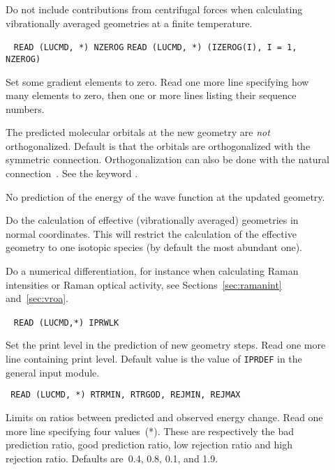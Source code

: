 \begin{description}
\item[] Do not include contributions from
centrifugal forces when calculating vibrationally averaged geometries
at a finite temperature.

\item[]\verb| |\newline
\verb|READ (LUCMD, *) NZEROG|\newline
\verb|READ (LUCMD, *) (IZEROG(I), I = 1, NZEROG)|

 Set some gradient elements  to zero.  Read
one more line specifying how many elements to zero, then one
or more lines listing their sequence numbers.

\item[] The predicted molecular orbitals at the new
geometry are {\em not} orthogonalized. Default is that the orbitals
are orthogonalized with the symmetric connection. Orthogonalization
can also be done with the natural
connection~\cite{joklbkrthpjtca90}. See the keyword .

\item[] No prediction of the energy of the wave function
at the updated geometry.

\item[] Do the calculation of effective (vibrationally
averaged) geometries in normal coordinates. This will restrict the
calculation of the effective geometry to one isotopic species (by
default the most abundant one).

\item[] Do a numerical
differentiation, for instance when
calculating Raman intensities or Raman optical activity, see
Sections~\ref{sec:ramanint} and~\ref{sec:vroa}.

\item[]\verb| |\newline
\verb|READ (LUCMD,*) IPRWLK|

Set the print level in the prediction of new geometry steps.  Read one
more line containing print level. Default value is the value of
\verb|IPRDEF| in the general input module.

\item[]\verb| |\newline
\verb|READ (LUCMD, *) RTRMIN, RTRGOD, REJMIN, REJMAX|

Limits on ratios between predicted and
observed energy change.  Read one more line specifying four
values~(*).  These are respectively the bad prediction ratio, good
prediction ratio, low rejection ratio and high rejection ratio.
Defaults are~0.4, 0.8, 0.1, and 1.9.


\end{description}
